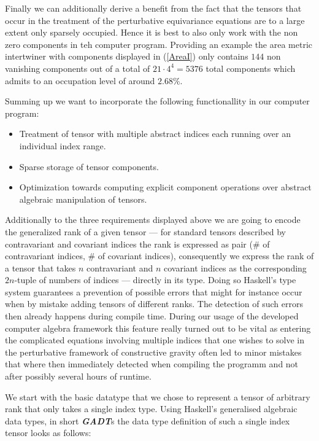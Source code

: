 \documentclass[a4paper,12pt, DIV=14, BCOR=5mm, twoside, headsepline]{scrbook}
\begin{document}
Finally we can additionally derive a benefit from the fact that the tensors that occur in the treatment of the perturbative equivariance equations are to a large extent only sparsely occupied. Hence it is best to also only work with the non zero components in teh computer program. Providing an example the area metric intertwiner with components displayed in (\ref{AreaI}) only contains $144$ non vanishing components out of a total of $21 \cdot 4^4 = 5376$ total components which admits to an occupation level of around $2.68 \%$.

Summing up we want to incorporate the following functionallity in our computer program:
\begin{itemize}
    \item Treatment of tensor with multiple abstract indices each running over an individual index range. 
    \item Sparse storage of tensor components.
    \item Optimization towards computing explicit component operations over abstract algebraic manipulation of tensors.
\end{itemize}

Additionally to the three requirements displayed above we are going to encode the generalized rank of a given tensor --- for standard tensors described by contravariant and covariant indices the rank is expressed as pair ($\#$ of contravariant indices, $\#$ of covariant indices), consequently we express the rank of a tensor that takes $n$ contravariant and $n$ covariant indices as the corresponding $2n$-tuple of numbers of indices --- directly in its type. Doing so Haskell's type system guarantees a prevention of possible errors that might for instance occur when by mistake adding tensors of different ranks. The detection of such errors then already happens during compile time. During our usage of the developed computer algebra framework this feature really turned out to be vital as entering the complicated equations involving multiple indices that one wishes to solve in the perturbative framework of constructive gravity often led to minor mistakes that where then immediately detected when compiling the programm and not after possibly several hours of runtime.

We start with the basic datatype that we chose to represent a tensor of arbitrary rank that only takes a single index type. Using Haskell's generalised algebraic data types, in short \textit{\textbf{GADT}}s the data type definition of such a single index tensor looks as follows: 
\end{document}

